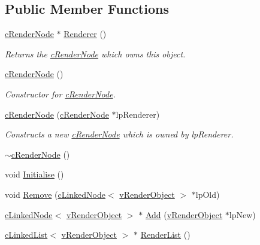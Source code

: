 \subsection*{Public Member Functions}
\begin{DoxyCompactItemize}
\item 
\hyperlink{classc_render_node}{cRenderNode} $\ast$ \hyperlink{classc_render_node_ad461c79a8a847a57448152e2401696f6}{Renderer} ()
\begin{DoxyCompactList}\small\item\em Returns the \hyperlink{classc_render_node}{cRenderNode} which owns this object. \item\end{DoxyCompactList}\item 
\hyperlink{classc_render_node_aeb068139475cb6af0aa41efc656e331d}{cRenderNode} ()
\begin{DoxyCompactList}\small\item\em Constructor for \hyperlink{classc_render_node}{cRenderNode}. \item\end{DoxyCompactList}\item 
\hyperlink{classc_render_node_a75357387655af01d4eccdbc37d978f52}{cRenderNode} (\hyperlink{classc_render_node}{cRenderNode} $\ast$lpRenderer)
\begin{DoxyCompactList}\small\item\em Constructs a new \hyperlink{classc_render_node}{cRenderNode} which is owned by lpRenderer. \item\end{DoxyCompactList}\item 
\hyperlink{classc_render_node_ab2c40bdb9caf33bed805eb06eea46e4b}{$\sim$cRenderNode} ()
\item 
void \hyperlink{classc_render_node_afc1e90112f4597a5858fccb97f700d59}{Initialise} ()
\item 
void \hyperlink{classc_render_node_a14695214d8c02b2bc1c96ed4dad0e435}{Remove} (\hyperlink{classc_linked_node}{cLinkedNode}$<$ \hyperlink{classv_render_object}{vRenderObject} $>$ $\ast$lpOld)
\item 
\hyperlink{classc_linked_node}{cLinkedNode}$<$ \hyperlink{classv_render_object}{vRenderObject} $>$ $\ast$ \hyperlink{classc_render_node_a7ea0792e0afd2e67ef16773a654fb57c}{Add} (\hyperlink{classv_render_object}{vRenderObject} $\ast$lpNew)
\item 
\hyperlink{classc_linked_list}{cLinkedList}$<$ \hyperlink{classv_render_object}{vRenderObject} $>$ $\ast$ \hyperlink{classc_render_node_ac694ca35d0abcdbdd5eb0c8869fbc63c}{RenderList} ()

\end{DoxyCompactItemize}

